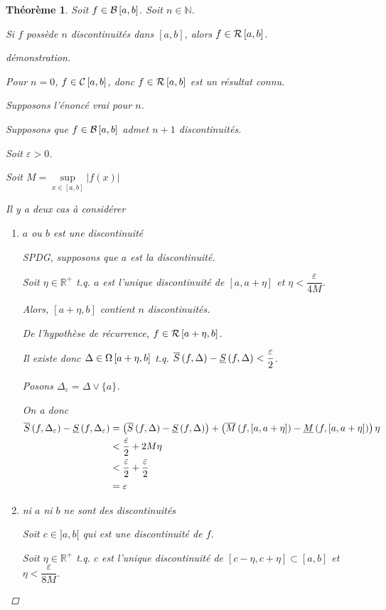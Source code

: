 \documentclass{report}
\newcommand*{\raffinement}[2]{#1 \vee #2}
\newcommand*{\abs}[1]{\left| #1 \right|}
\newcommand*{\eps}{\varepsilon}
\newcommand*{\reels}{\mathbb{R}}
\newcommand*{\naturels}{\mathbb{N}}
\newtheorem*{thm}{Th\'eor\`eme}
\theoremstyle{definition}
\theoremstyle{remark}
\begin{document}
	\begin{thm}
		Soit $f \in \bornee$. Soit $n \in \naturels$.

		Si $f$ poss\`ede $n$ discontinuit\'es dans $[a,b]$, alors $f \in \riemann$.
		\begin{proof}[d\'emonstration]~

			Pour $n=0$, $f \in \continue$, donc $f \in \riemann$ est un r\'esultat connu.

			Supposons l'\'enonc\'e vrai pour $n$.

			Supposons que $f \in \bornee$ admet $n+1$ discontinuit\'es.

			Soit $\eps>0$.

			Soit $M=\sup\limits_{x\in[a,b]}\abs{f(x)}$

			Il y a deux cas \`a consid\'erer

			\begin{enumerate}
				\item $a$ ou $b$ est une discontinuit\'e

				SPDG, supposons que $a$ est la discontinuit\'e.

				Soit $\eta \in \reels^+$ t.q. $a$ est l'unique discontinuit\'e de $[a,a+\eta]$ et $\eta < \dfrac{\eps}{4M}$.

				Alors, $[a+\eta,b]$ contient $n$ discontinuit\'es.

				De l'hypoth\`ese de r\'ecurrence, $f \in \riemann[a+\eta,b]$.

				Il existe donc $\Delta \in \partitions[a+\eta,b]$ t.q. $\ssup{f} - \sinf{f} < \dfrac{\eps}{2}$.

				Posons $\Delta_\eps = \raffinement{\Delta}{\{a\}}$.

				On a donc
				\begin{align*}
					\ssup{f}[\Delta_\eps] - \sinf{f}[\Delta_\eps]&= \left( \ssup{f} - \sinf{f} \right) + \left( \msup{f}[a,a+\eta] - \minf{f}[a,a+\eta] \right) \eta\\
					&< \frac{\eps}{2} + 2M\eta\\
					&< \dfrac{\eps}{2} + \dfrac{\eps}{2}\\
					&= \eps
				\end{align*}
				\item ni $a$ ni $b$ ne sont des discontinuit\'es

				Soit $c \in ]a,b[$ qui est une discontinuit\'e de $f$.

				Soit $\eta \in \reels^+$ t.q. $c$ est l'unique discontinuit\'e de $[c-\eta,c+\eta] \subset [a,b]$ et $\eta < \dfrac{\eps}{8M}$.


\end{enumerate}
\end{proof}
\end{thm}
\end{document}
